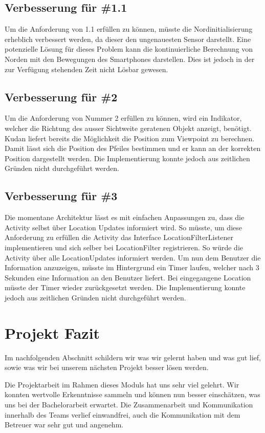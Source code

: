 \documentclass[a4paper]{scrreprt}
\begin{document}
\subsection{Verbesserung für \#1.1}
Um die Anforderung von 1.1 erfüllen zu können, müsste die Nordinitialisierung erheblich verbessert werden, da dieser den ungenauesten Sensor darstellt. Eine potenzielle Lösung für dieses Problem kann die kontinuierliche Berechnung von Norden mit den Bewegungen des Smartphones darstellen. Dies ist jedoch in der zur Verfügung stehenden Zeit nicht Lösbar gewesen.

\subsection{Verbesserung für \#2}
Um die Anforderung von Nummer 2 erfüllen zu können, wird ein Indikator, welcher die Richtung des ausser Sichtweite geratenen Objekt anzeigt, benötigt. Kudan liefert bereits die Möglichkeit die Position zum Viewpoint zu berechnen. Damit lässt sich die Position des Pfeiles bestimmen und er kann an der korrekten Position dargestellt werden. Die Implementierung konnte jedoch aus zeitlichen Gründen nicht durchgeführt werden.

\subsection{Verbesserung für \#3}
Die momentane Architektur lässt es mit einfachen Anpassungen zu, dass die Activity selbst über Location Updates informiert wird. So müsste, um diese Anforderung zu erfüllen die Activity das Interface LocationFilterListener implementieren und sich selber bei LocationFilter registrieren. So würde die Activity über alle LocationUpdates informiert werden. Um nun dem Benutzer die Information anzuzeigen, müsste im Hintergrund ein Timer laufen, welcher nach 3 Sekunden eine Information an den Benutzer liefert. Bei eingegangene Location müsste der Timer wieder zurückgesetzt werden. Die Implementierung konnte jedoch aus zeitlichen Gründen nicht durchgeführt werden.

\section{Projekt Fazit}
Im nachfolgenden Abschnitt schildern wir was wir gelernt haben und was gut lief, sowie was wir bei unserem nächsten Projekt besser lösen werden.


Die Projektarbeit im Rahmen dieses Moduls hat uns sehr viel gelehrt. Wir konnten wertvolle Erkenntnisse sammeln und können nun besser einschätzen, was uns bei der Bachelorarbeit erwartet. Die Zusammenarbeit und Kommunikation innerhalb des Teams verlief einwandfrei, auch die Kommunikation mit dem Betreuer war sehr gut und angenehm.
\end{document}
